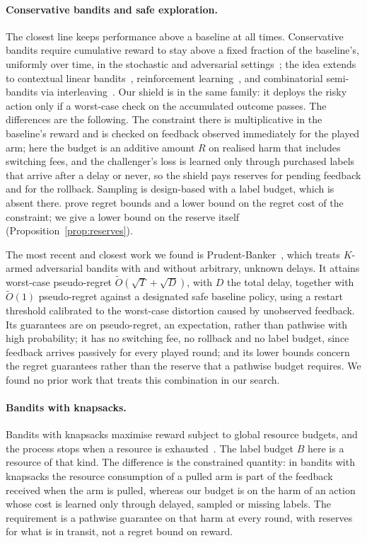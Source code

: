 \documentclass[10pt]{article}
\theoremstyle{plain}
\theoremstyle{definition}
\begin{document}
\paragraph{Conservative bandits and safe exploration.}
The closest line keeps performance above a baseline at all times. Conservative bandits require cumulative reward to stay above a fixed fraction of the baseline's, uniformly over time, in the stochastic and adversarial settings~\citep{wu2016conservative}; the idea extends to contextual linear bandits~\citep{kazerouni2017conservative}, reinforcement learning~\citep{garcelon2020conservative}, and combinatorial semi-bandits via interleaving~\citep{katariya2019conservative}. Our shield is in the same family: it deploys the risky action only if a worst-case check on the accumulated outcome passes.
The differences are the following. The constraint there is multiplicative in the baseline's reward and is checked on feedback observed immediately for the played arm; here the budget is an additive amount $R$ on realised harm that includes switching fees, and the challenger's loss is learned only through purchased labels that arrive after a delay or never, so the shield pays reserves for pending feedback and for the rollback. Sampling is design-based with a label budget, which is absent there. \citet{wu2016conservative} prove regret bounds and a lower bound on the regret cost of the constraint; we give a lower bound on the reserve itself (Proposition~\ref{prop:reserves}).

The most recent and closest work we found is Prudent-Banker~\citep{hu2026prudent}, which treats $K$-armed adversarial bandits with and without arbitrary, unknown delays. It attains worst-case pseudo-regret $\tilde O(\sqrt T+\sqrt D)$, with $D$ the total delay, together with $\tilde O(1)$ pseudo-regret against a designated safe baseline policy, using a restart threshold calibrated to the worst-case distortion caused by unobserved feedback. Its guarantees are on pseudo-regret, an expectation, rather than pathwise with high probability; it has no switching fee, no rollback and no label budget, since feedback arrives passively for every played round; and its lower bounds concern the regret guarantees rather than the reserve that a pathwise budget requires. We found no prior work that treats this combination in our search.

\paragraph{Bandits with knapsacks.}
Bandits with knapsacks maximise reward subject to global resource budgets, and the process stops when a resource is exhausted~\citep{badanidiyuru2013bandits,badanidiyuru2018bandits}. The label budget $B$ here is a resource of that kind. The difference is the constrained quantity: in bandits with knapsacks the resource consumption of a pulled arm is part of the feedback received when the arm is pulled, whereas our budget is on the harm of an action whose cost is learned only through delayed, sampled or missing labels. The requirement is a pathwise guarantee on that harm at every round, with reserves for what is in transit, not a regret bound on reward.
\end{document}
